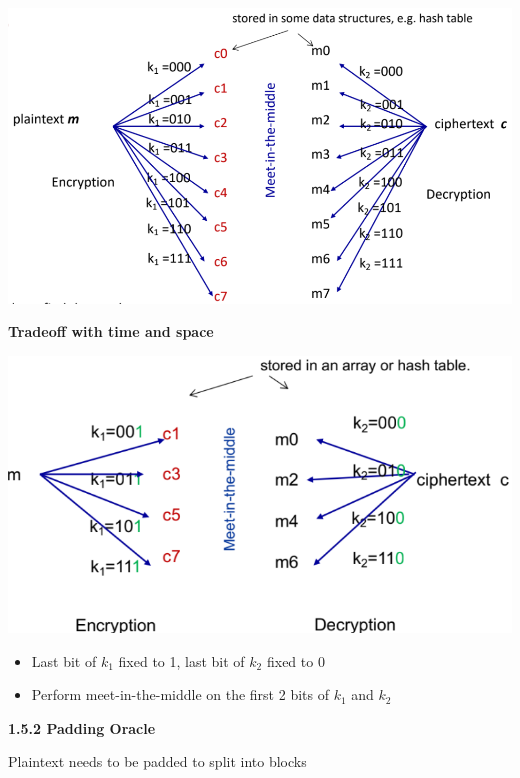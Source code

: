 \documentclass[landscape,a4paper]{extarticle}
\newenvironment{Figure}
  {\par\noindent\minipage{\linewidth}}
  {\endminipage\par\medskip}
\begin{document}
\begin{multicols*}{5}
    \begin{Figure}
        \centering
        \includegraphics[width=\linewidth]{meet_in_the_middle.png}        
    \end{Figure}

    \textbf{Tradeoff with time and space}

    \begin{Figure}
        \centering
        \includegraphics[width=\linewidth]{meet_in_the_middle_tradeoff.png}        
    \end{Figure}

    \begin{itemize}
        \item Last bit of $k_1$ fixed to 1, last bit of $k_2$ fixed to 0
        \item Perform meet-in-the-middle on the first 2 bits of $k_1$ and $k_2$
    \end{itemize}

    \textbf{1.5.2 Padding Oracle}

    Plaintext needs to be padded to split into blocks


\end{multicols*}
\end{document}
